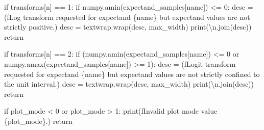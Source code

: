 \documentclass[
  letterpaper,
  DIV=11,
  numbers=noendperiod]{scrartcl}
\newenvironment{Shaded}{\begin{snugshade}}{\end{snugshade}}
\newcommand{\BuiltInTok}[1]{\textcolor[rgb]{0.00,0.23,0.31}{#1}}
\newcommand{\CharTok}[1]{\textcolor[rgb]{0.13,0.47,0.30}{#1}}
\newcommand{\ControlFlowTok}[1]{\textcolor[rgb]{0.00,0.23,0.31}{#1}}
\newcommand{\DecValTok}[1]{\textcolor[rgb]{0.68,0.00,0.00}{#1}}
\newcommand{\KeywordTok}[1]{\textcolor[rgb]{0.00,0.23,0.31}{#1}}
\newcommand{\NormalTok}[1]{\textcolor[rgb]{0.00,0.23,0.31}{#1}}
\newcommand{\OperatorTok}[1]{\textcolor[rgb]{0.37,0.37,0.37}{#1}}
\newcommand{\SpecialCharTok}[1]{\textcolor[rgb]{0.37,0.37,0.37}{#1}}
\newcommand{\SpecialStringTok}[1]{\textcolor[rgb]{0.13,0.47,0.30}{#1}}
\newcommand{\StringTok}[1]{\textcolor[rgb]{0.13,0.47,0.30}{#1}}
\begin{document}
\begin{Shaded}
\begin{Highlighting}[]
    \ControlFlowTok{if}\NormalTok{ transforms[n] }\OperatorTok{==} \DecValTok{1}\NormalTok{:}
      \ControlFlowTok{if}\NormalTok{ numpy.amin(expectand\_samples[name]) }\OperatorTok{\textless{}=} \DecValTok{0}\NormalTok{:}
\NormalTok{        desc }\OperatorTok{=}\NormalTok{ (}\SpecialStringTok{f\textquotesingle{}Log transform requested for expectand }\SpecialCharTok{\{}\NormalTok{name}\SpecialCharTok{\}}\SpecialStringTok{ \textquotesingle{}}
                \StringTok{\textquotesingle{}but expectand values are not strictly positive.\textquotesingle{}}\NormalTok{)}
\NormalTok{        desc }\OperatorTok{=}\NormalTok{ textwrap.wrap(desc, max\_width)}
        \BuiltInTok{print}\NormalTok{(}\StringTok{\textquotesingle{}}\CharTok{\textbackslash{}n}\StringTok{\textquotesingle{}}\NormalTok{.join(desc))}
        \ControlFlowTok{return}
    
    \ControlFlowTok{if}\NormalTok{ transforms[n] }\OperatorTok{==} \DecValTok{2}\NormalTok{:}
      \ControlFlowTok{if}\NormalTok{ (numpy.amin(expectand\_samples[name]) }\OperatorTok{\textless{}=} \DecValTok{0} \KeywordTok{or}
\NormalTok{          numpy.amax(expectand\_samples[name]) }\OperatorTok{\textgreater{}=} \DecValTok{1}\NormalTok{):}
\NormalTok{        desc }\OperatorTok{=}\NormalTok{ (}\SpecialStringTok{f\textquotesingle{}Logit transform requested for expectand }\SpecialCharTok{\{}\NormalTok{name}\SpecialCharTok{\}}\SpecialStringTok{ \textquotesingle{}}
                \StringTok{\textquotesingle{}but expectand values are not strictly confined \textquotesingle{}}
                \StringTok{\textquotesingle{}to the unit interval.\textquotesingle{}}\NormalTok{)}
\NormalTok{        desc }\OperatorTok{=}\NormalTok{ textwrap.wrap(desc, max\_width)}
        \BuiltInTok{print}\NormalTok{(}\StringTok{\textquotesingle{}}\CharTok{\textbackslash{}n}\StringTok{\textquotesingle{}}\NormalTok{.join(desc))}
        \ControlFlowTok{return}
  
  \ControlFlowTok{if}\NormalTok{ plot\_mode }\OperatorTok{\textless{}} \DecValTok{0} \KeywordTok{or}\NormalTok{ plot\_mode }\OperatorTok{\textgreater{}} \DecValTok{1}\NormalTok{:}
    \BuiltInTok{print}\NormalTok{(}\SpecialStringTok{f\textquotesingle{}Invalid \textasciigrave{}plot mode\textasciigrave{} value }\SpecialCharTok{\{}\NormalTok{plot\_mode}\SpecialCharTok{\}}\SpecialStringTok{.\textquotesingle{}}\NormalTok{)}
    \ControlFlowTok{return}
  

\end{Highlighting}
\end{Shaded}
\end{document}
